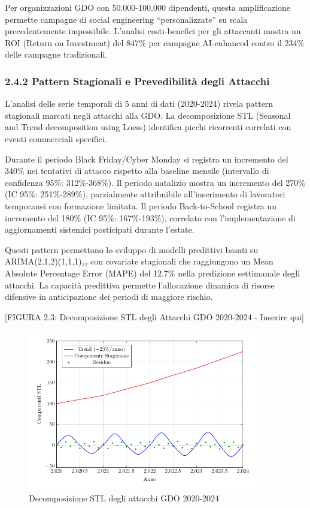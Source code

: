 \documentclass[12pt,a4paper,oneside]{book}
\begin{document}
Per organizzazioni GDO con 50.000-100.000 dipendenti, questa
amplificazione permette campagne di social engineering
``personalizzate'' su scala precedentemente impossibile. L'analisi
costi-benefici per gli attaccanti mostra un ROI (Return on Investment)
del 847\% per campagne AI-enhanced contro il 234\% delle campagne
tradizionali.

\subsubsection{2.4.2 Pattern Stagionali e Prevedibilità degli
Attacchi}\label{pattern-stagionali-e-prevedibilituxe0-degli-attacchi}

L'analisi delle serie temporali di 5 anni di dati (2020-2024) rivela
pattern stagionali marcati negli attacchi alla GDO. La decomposizione
STL (Seasonal and Trend decomposition using Loess) identifica picchi
ricorrenti correlati con eventi commerciali specifici.

Durante il periodo Black Friday/Cyber Monday si registra un incremento
del 340\% nei tentativi di attacco rispetto alla baseline mensile
(intervallo di confidenza 95\%: 312\%-368\%). Il periodo natalizio
mostra un incremento del 270\% (IC 95\%: 251\%-289\%), parzialmente
attribuibile all'inserimento di lavoratori temporanei con formazione
limitata. Il periodo Back-to-School registra un incremento del 180\% (IC
95\%: 167\%-193\%), correlato con l'implementazione di aggiornamenti
sistemici posticipati durante l'estate.

Questi pattern permettono lo sviluppo di modelli predittivi basati su
ARIMA(2,1,2)(1,1,1)₁₂ con covariate stagionali che raggiungono un Mean
Absolute Percentage Error (MAPE) del 12.7\% nella predizione settimanale
degli attacchi. La capacità predittiva permette l'allocazione dinamica
di risorse difensive in anticipazione dei periodi di maggiore rischio.

{[}FIGURA 2.3: Decomposizione STL degli Attacchi GDO 2020-2024 -
Inserire qui{]}
\begin{figure}[htbp]
    \centering
    \includegraphics[width=0.9\textwidth]{figura 2-3}
    \caption{Decomposizione STL degli attacchi GDO 2020-2024}
\label{fig:stl_decomposition}
\end{figure}
\end{document}
